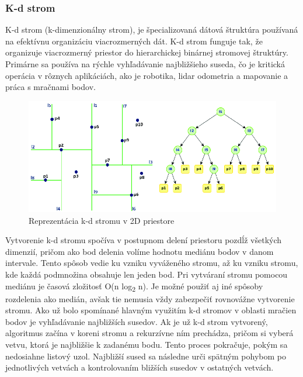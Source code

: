 \subsubsection{K-d strom}
\noindent K-d strom (k-dimenzionálny strom), je špecializovaná dátová štruktúra používaná na efektívnu organizáciu viacrozmerných dát. K-d strom funguje tak, že organizuje viacrozmerný priestor do hierarchickej binárnej stromovej štruktúry. Primárne sa používa na rýchle vyhľadávanie najbližšieho suseda, čo je kritická operácia v rôznych aplikáciách, ako je robotika, \acrshort{lidar} odometria a mapovanie a práca s mračnami bodov. \cite{kd_tree_new} \cite{kd_tree_old} 
\newline\begin{figure}[!htbp]
  \centering
  \includegraphics[width=14cm]{img/kd-tree.png}
  \caption{Reprezentácia k-d stromu v 2D priestore \cite{kd_tree}}
  \label{kd_tree}
\end{figure}
\newline\indent Vytvorenie k-d stromu spočíva v postupnom delení priestoru pozdĺž všetkých dimenzií, pričom ako bod delenia volíme hodnotu mediánu bodov v danom intervale. Tento spôsob vedie ku vzniku vyváženého stromu, až ku vzniku stromu, kde každá podmnožina obsahuje len jeden bod. Pri vytváraní stromu pomocou mediánu je časová zložitosť O(n log\textsubscript{2} n). Je možné použiť aj iné spôsoby rozdelenia ako medián, avšak tie nemusia vždy zabezpečiť rovnovážne vytvorenie stromu. \cite{kd_tree_old} 
\newline\indent Ako už bolo spomínané hlavným využitím k-d stromov v oblasti mračien bodov je vyhľadávanie najbližších susedov. Ak je už k-d strom vytvorený, algoritmus začína v koreni stromu a rekurzívne ním prechádza, pričom si vyberá vetvu, ktorá je najbližšie k zadanému bodu. Tento proces pokračuje, pokým sa nedosiahne listový uzol. Najbližší sused sa následne urči spätným pohybom po jednotlivých vetvách a kontrolovaním bližších susedov v ostatných vetvách. \cite{kd_tree_old}

